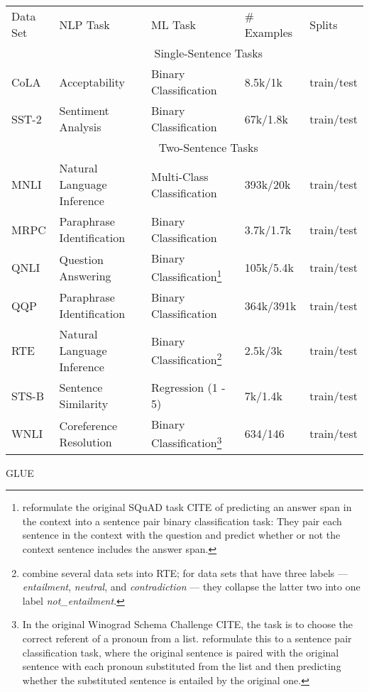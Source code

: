 {\begin{tabular}{l|llll}
	Data Set & NLP Task & ML Task & \# Examples & Splits \\
	\hhline{=|====}
	& \multicolumn{4}{c}{Single-Sentence Tasks} \\
	CoLA &  Acceptability & Binary Classification & 8.5k/1k & train/test \\
	SST-2 & Sentiment Analysis & Binary Classification & 67k/1.8k & train/test \\
	\hline
	& \multicolumn{4}{c}{Two-Sentence Tasks} \\
	MNLI & Natural Language Inference & Multi-Class Classification &  393k/20k & train/test \\
	MRPC & Paraphrase Identification & Binary Classification & 3.7k/1.7k & train/test \\
	QNLI & Question Answering & Binary Classification\footnote{\cite{wang2018glue} reformulate the original SQuAD task CITE of predicting an answer span in the context into a sentence pair binary classification task: They pair each sentence in the context with the question and predict whether or not the context sentence includes the answer span.} &  105k/5.4k & train/test \\
	QQP & Paraphrase Identification & Binary Classification &  364k/391k & train/test \\
	RTE & Natural Language Inference & Binary Classification\footnote{\cite{wang2018glue} combine several data sets into RTE; for data sets that have three labels --- \emph{entailment}, \emph{neutral}, and \emph{contradiction} --- they collapse the latter two into one label \emph{not\_entailment}.} &  2.5k/3k & train/test \\
	STS-B & Sentence Similarity & Regression (1 - 5) & 7k/1.4k & train/test \\
	WNLI & Coreference Resolution & Binary Classification\footnote{In the original Winograd Schema Challenge CITE, the task is to choose the correct referent of a pronoun from a list. \cite{wang2018glue} reformulate this to a sentence pair classification task, where the original sentence is paired with the original sentence with each pronoun substituted from the list and then predicting whether the substituted sentence is entailed by the original one.} &  634/146 & train/test \\
\end{tabular}
}{GLUE}


